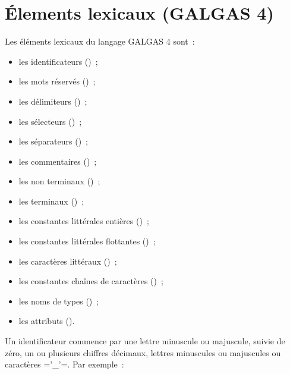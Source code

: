 
\chapter{Élements lexicaux (GALGAS 4)}



Les éléments lexicaux du langage GALGAS 4 sont~:
\begin{itemize}
  \item les identificateurs ()~;
  \item les mots réservés ()~;
  \item les délimiteurs ()~;
  \item les sélecteurs  ()~;
  \item les séparateurs  ()~;
  \item les commentaires  ()~;
  \item les non terminaux  ()~;
  \item les terminaux ()~;
  \item les constantes littérales entières ()~;
  \item les constantes littérales flottantes ()~;
  \item les caractères littéraux ()~;
  \item les constantes chaînes de caractères ()~;
  \item les noms de types ()~;
  \item les attributs ().
\end{itemize}



Un identificateur commence par une lettre minuscule ou majuscule, suivie de zéro, un ou plusieurs chiffres décimaux, lettres minuscules ou majuscules ou caractères \ggsq='_'=. Par exemple~:

